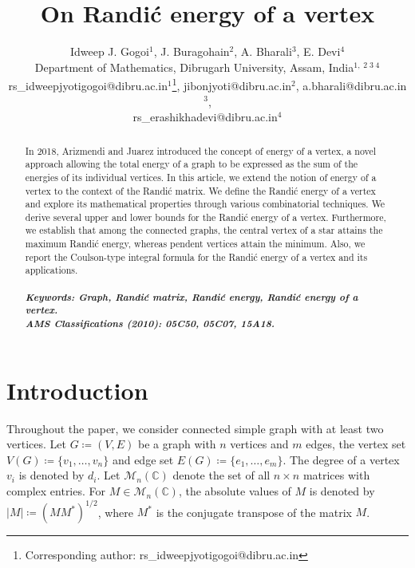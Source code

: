 \documentclass[10 pt]{article}
\date{}
\numberwithin{equation}{section}
\begin{document}
\title{\textbf{On Randi\'c energy of a vertex}}
	\date{}
\author{Idweep J. Gogoi$^1$, J. Buragohain$^2$, A. Bharali$^3$, E. Devi$^4$ \\
	Department of Mathematics, Dibrugarh University, Assam, India$^{1,\;2\;3\;4}$\\
rs_idweepjyotigogoi@dibru.ac.in$^1$\footnote{Corresponding author: rs_idweepjyotigogoi@dibru.ac.in}, jibonjyoti@dibru.ac.in$^2$, a.bharali@dibru.ac.in$^3$,\\ rs_erashikhadevi@dibru.ac.in$^4$}
\maketitle

\begin{abstract}
In 2018, Arizmendi and Juarez introduced the concept of energy of a vertex, a novel approach allowing the total energy of a graph to be expressed as the sum of the energies of its individual vertices. In this article, we extend the notion of energy of a vertex to the context of the Randi\'c matrix. We define the Randi\'c energy of a vertex and explore its mathematical properties through various combinatorial techniques. We derive several upper and lower bounds for the Randi\'c energy of a vertex. Furthermore, we establish that among the connected graphs, the central vertex of a star attains the maximum Randi\'c energy, whereas pendent vertices attain the minimum. Also, we report the Coulson-type integral formula for the Randi\'c energy of a vertex and its applications.\\\\
\itshape \bf {Keywords:} \normalfont Graph, Randi\'c matrix, Randi\'c energy, Randi\'c energy of a vertex.\normalfont \\
\itshape \bf {AMS Classifications (2010):} 05C50, 05C07, 15A18.
\end{abstract}
\section{Introduction}
Throughout the paper, we consider connected simple graph with at least two vertices. Let $G\coloneqq(V,E)$ be a graph with $n$ vertices and $m$ edges, the vertex set $V(G)\coloneqq\{v_1,\ldots,v_n\}$ and edge set $E(G)\coloneqq\{e_1,\ldots,e_m\}$. The degree of a vertex $v_i$ is denoted by $d_i$. Let $\mathcal{M}_n(\mathbb{C})$ denote the set of all $n\times n$ matrices with complex entries. For $M \in \mathcal{M}_n(\mathbb{C})$, the absolute values of $M$ is denoted by $|M|\coloneqq(MM^*)^{1/2}$, where $M^*$ is the conjugate transpose of the matrix $M$.
\end{document}

